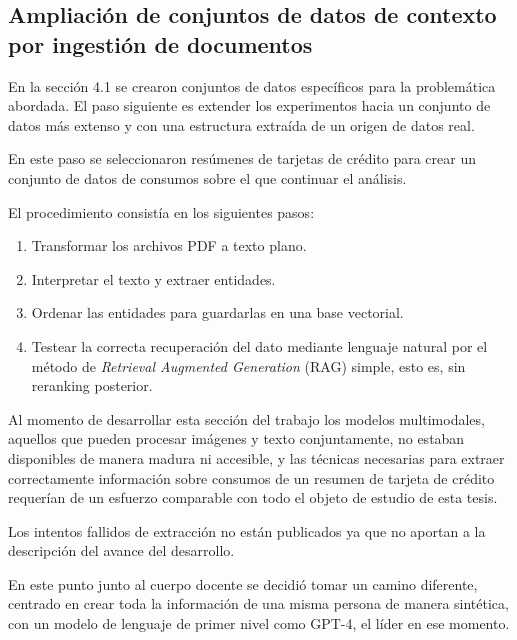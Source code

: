 \subsection{Ampliación de conjuntos de datos de contexto por ingestión de documentos}

En la sección 4.1 se crearon conjuntos de datos específicos para la problemática abordada. El paso siguiente es extender los experimentos hacia un conjunto de datos más extenso y con una estructura extraída de un origen de datos real.

En este paso se seleccionaron resúmenes de tarjetas de crédito para crear un conjunto de datos de consumos sobre el que continuar el análisis.

El procedimiento consistía en los siguientes pasos:

\begin{enumerate}
    \item Transformar los archivos PDF a texto plano.
    \item Interpretar el texto y extraer entidades.
    \item Ordenar las entidades para guardarlas en una base vectorial.
    \item Testear la correcta recuperación del dato mediante lenguaje natural por el método de \textit{Retrieval Augmented Generation} (RAG) simple, esto es, sin reranking posterior.
\end{enumerate}

Al momento de desarrollar esta sección del trabajo los modelos multimodales, aquellos que pueden procesar imágenes y texto conjuntamente, no estaban disponibles de manera madura ni accesible, y las técnicas necesarias para extraer correctamente información sobre consumos de un resumen de tarjeta de crédito requerían de un esfuerzo comparable con todo el objeto de estudio de esta tesis.

Los intentos fallidos de extracción no están publicados ya que no aportan a la descripción del avance del desarrollo.

En este punto junto al cuerpo docente se decidió tomar un camino diferente, centrado en crear toda la información de una misma persona de manera sintética, con un modelo de lenguaje de primer nivel como GPT-4, el líder en ese momento. 